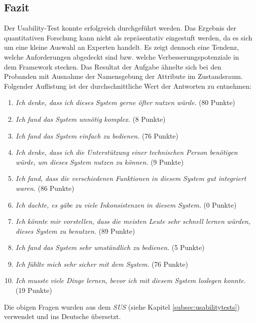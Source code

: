     \subsection{Fazit}
    \label{subsec:usabilityFazit}
        Der Usability-Test konnte erfolgreich durchgeführt werden.
        Das Ergebnis der quantitativen Forschung kann nicht als repräsentativ eingestuft werden, da es sich um eine kleine Auswahl an Experten handelt. Es zeigt dennoch eine Tendenz, 
        welche Anforderungen abgedeckt sind bzw. welche Verbesserungspotenziale in dem Framework stecken.  
        Das Resultat der Aufgabe ähnelte sich bei den Probanden mit Ausnahme der Namensgebung der Attribute im Zustandsraum. 
        \\
        Folgender Auflistung ist der durchschnittliche Wert der Antworten zu entnehmen:
        \begin{enumerate}
            \item \textit{Ich denke, dass ich dieses System gerne öfter nutzen würde.} (80 Punkte)
            \item \textit{Ich fand das System unnötig komplex.} (8 Punkte)
            \item \textit{Ich fand das System einfach zu bedienen.} (76 Punkte)
            \item \textit{Ich denke, dass ich die Unterstützung einer technischen Person benötigen würde, um dieses System nutzen zu können.} (9 Punkte)
            \item \textit{Ich fand, dass die verschiedenen Funktionen in diesem System gut integriert waren.} (86 Punkte)
            \item \textit{Ich dachte, es gäbe zu viele Inkonsistenzen in diesem System.} (0 Punkte)
            \item \textit{Ich könnte mir vorstellen, dass die meisten Leute sehr schnell lernen würden, dieses System zu benutzen.} (89 Punkte)
            \item \textit{Ich fand das System sehr umständlich zu bedienen.} (5 Punkte)
            \item \textit{Ich fühlte mich sehr sicher mit dem System.} (76 Punkte)
            \item \textit{Ich musste viele Dinge lernen, bevor ich mit diesem System loslegen konnte.} (19 Punkte)
        \end{enumerate}
        Die obigen Fragen wurden aus dem \textit{SUS} \cite{brook1995} (siehe Kapitel \ref{subsec:usabilitytests}) verwendet und ins Deutsche übersetzt. 
        \\
